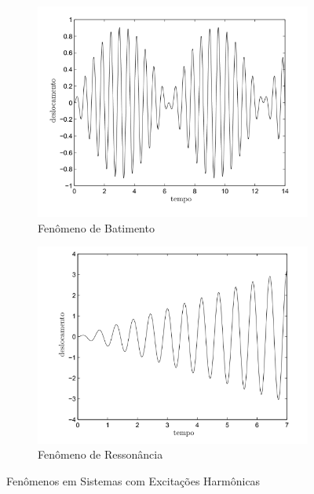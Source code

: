 \documentclass{article}
\begin{document}
\begin{figure}[h]
    \begin{subfigure}{0.5\textwidth}
        \centering
        \includegraphics[width=\textwidth]{imgs/batimento.png}
        \caption{Fenômeno de Batimento}
    \end{subfigure}%
    \begin{subfigure}{0.5\textwidth}
        \centering
        \includegraphics[width=\textwidth]{imgs/reso.png}
        \caption{Fenômeno de Ressonância}
    \end{subfigure}
    \caption{Fenômenos em Sistemas com Excitações Harmônicas}
\end{figure}
\end{document}
